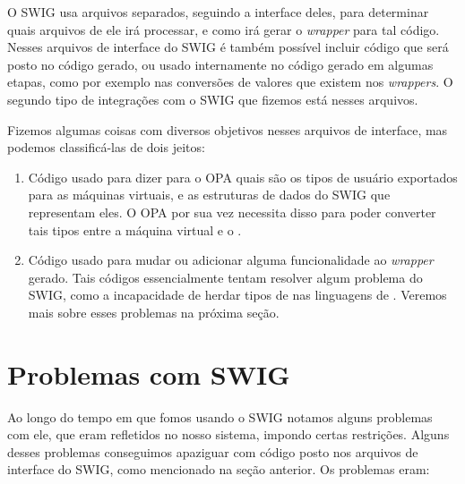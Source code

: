   O SWIG usa arquivos separados, seguindo a interface deles, para determinar quais arquivos
  de \CXX{} ele irá processar, e como irá gerar o \textit{wrapper} para tal código. Nesses arquivos
  de interface do SWIG é também possível incluir código que será posto no código gerado, ou usado
  internamente no código gerado em algumas etapas, como por exemplo nas conversões de valores
  que existem nos \textit{wrappers}. O segundo tipo de integrações com o SWIG que fizemos está
  nesses arquivos.
  
  Fizemos algumas coisas com diversos objetivos nesses arquivos de interface, mas podemos
  classificá-las de dois jeitos:
  \begin{enumerate}
    \item Código usado para dizer para o OPA quais são os tipos de usuário exportados para
      as máquinas virtuais, e as estruturas de dados do SWIG que representam eles. O OPA
      por sua vez necessita disso para poder converter tais tipos entre a máquina virtual
      e o \CXX{}.
    \item Código usado para mudar ou adicionar alguma funcionalidade ao \textit{wrapper}
      gerado. Tais códigos essencialmente tentam resolver algum problema do SWIG, como
      a incapacidade de herdar tipos de \CXX{} nas linguagens de \script{}. Veremos mais
      sobre esses problemas na próxima seção.
  \end{enumerate}
  
  
  \section{Problemas com SWIG}
  Ao longo do tempo em que fomos usando o SWIG notamos alguns problemas com ele, que eram
  refletidos no nosso sistema, impondo certas restrições. Alguns desses problemas conseguimos
  apaziguar com código posto nos arquivos de interface do SWIG, como mencionado na seção
  anterior. Os problemas eram:
  
